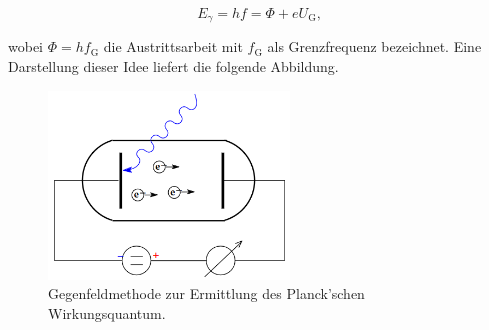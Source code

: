 \begin{equation}
    E_\gamma = hf = \Phi + eU_\text{G},
\label{eqn:Energiebilanz2}
\end{equation}

\noindent wobei $\Phi = hf_\text{G}$ die Austrittsarbeit mit $f_\text{G}$ als Grenzfrequenz bezeichnet. Eine Darstellung dieser Idee liefert die folgende Abbildung.

\begin{figure}
    \centering
    \includegraphics[height=5cm]{content/Gegenfeldmethode.png}
    \caption{Gegenfeldmethode zur Ermittlung des Planck'schen Wirkungsquantum\cite{Versuchsanleitung_v500}.}
    \label{fig:Gegenfeldmethode}
\end{figure}


%